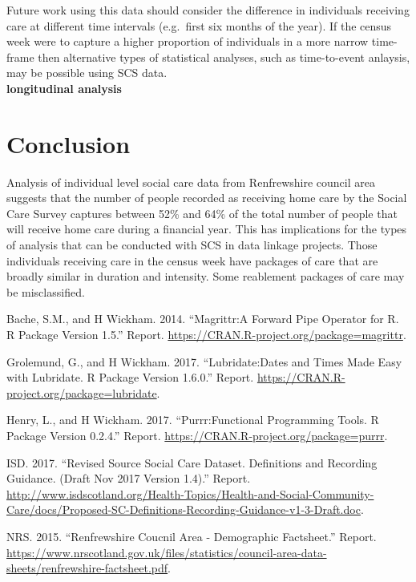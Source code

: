 \documentclass[]{article}
\begin{document}
Future work using this data should consider the difference in
individuals receiving care at different time intervals (e.g.~first six
months of the year). If the census week were to capture a higher
proportion of individuals in a more narrow time-frame then alternative
types of statistical analyses, such as time-to-event anlaysis, may be
possible using SCS data.\\
\textbf{longitudinal analysis}

\section{Conclusion}\label{sec:renf-conc}

Analysis of individual level social care data from Renfrewshire council
area suggests that the number of people recorded as receiving home care
by the Social Care Survey captures between 52\% and 64\% of the total
number of people that will receive home care during a financial year.
This has implications for the types of analysis that can be conducted
with SCS in data linkage projects. Those individuals receiving care in
the census week have packages of care that are broadly similar in
duration and intensity. Some reablement packages of care may be
misclassified.

\hypertarget{refs}{}
\hypertarget{ref-RN526}{}
Bache, S.M., and H Wickham. 2014. ``Magrittr:A Forward Pipe Operator for
R. R Package Version 1.5.'' Report.
\url{https://CRAN.R-project.org/package=magrittr}.

\hypertarget{ref-RN522}{}
Grolemund, G., and H Wickham. 2017. ``Lubridate:Dates and Times Made
Easy with Lubridate. R Package Version 1.6.0.'' Report.
\url{https://CRAN.R-project.org/package=lubridate}.

\hypertarget{ref-RN523}{}
Henry, L., and H Wickham. 2017. ``Purrr:Functional Programming Tools. R
Package Version 0.2.4.'' Report.
\url{https://CRAN.R-project.org/package=purrr}.

\hypertarget{ref-RN500}{}
ISD. 2017. ``Revised Source Social Care Dataset. Definitions and
Recording Guidance. (Draft Nov 2017 Version 1.4).'' Report.
\url{http://www.isdscotland.org/Health-Topics/Health-and-Social-Community-Care/docs/Proposed-SC-Definitions-Recording-Guidance-v1-3-Draft.doc}.

\hypertarget{ref-RN492}{}
NRS. 2015. ``Renfrewshire Coucnil Area - Demographic Factsheet.''
Report.
\url{https://www.nrscotland.gov.uk/files/statistics/council-area-data-sheets/renfrewshire-factsheet.pdf}.
\end{document}
